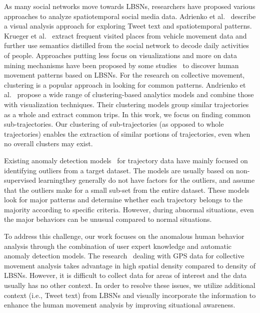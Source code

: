 As many social networks move towards LBSNs, researchers have proposed various approaches to analyze spatiotemporal social media data.
Adrienko et al.~\cite{Andrienko:2013:TPG} describe a visual analysis approach for exploring Tweet text and spatiotemporal patterns.
Krueger et al.~\cite{Krueger:2014:VAM} extract frequent visited places from vehicle movement data and further use semantics distilled from the social network to decode daily activities of people.
Approaches putting less focus on visualizations and more on data mining mechanisms have been
proposed by some studies~\cite{Wei:2012:CPR,Braga:2011:TCA,Cho:2011:FAM} to discover human movement patterns based on LBSNs.
For the research on collective movement, clustering is a popular approach in looking for common patterns.
Andrienko et al.~\cite{Andrienko:2013:Visual} propose a wide range of clustering-based analytics models and combine those with visualization techniques.
Their clustering models group similar trajectories as a whole and extract common trips.
In this work, we focus on finding common sub-trajectories.
Our clustering of sub-trajectories (as opposed to whole trajectories) enables the extraction of similar portions of trajectories, even when no overall clusters may exist.

Existing anomaly detection models~\cite{Liao:2010:Anomaly,Knorr:2000:DOA,Breunig:2000:LOF} for trajectory data have mainly focused on identifying outliers from a target dataset.
The models are usually based on non-supervised learning\textemdash they generally do not have factors for the outliers, and assume that the outliers make for a small sub-set from the entire dataset.
These models look for major patterns and determine whether each trajectory belongs to the majority according to specific criteria.
However, during abnormal situations, even the major behaviors can be unusual compared to normal situations.

To address this challenge, our work focuses on the anomalous human behavior analysis through the combination of user expert knowledge and automatic anomaly detection models.
The research~\cite{Andrienko:2007:Visual,Adrienko:2011:SGA,Andrienko:2013:STU} dealing with GPS data for collective movement analysis takes advantage in high spatial density compared to density of LBSNs.
However, it is difficult to collect data for areas of interest and the data usually has no other context.
In order to resolve these issues, we utilize additional context (i.e., Tweet text) from LBSNs and visually incorporate the information to enhance the human movement analysis by improving situational awareness.


